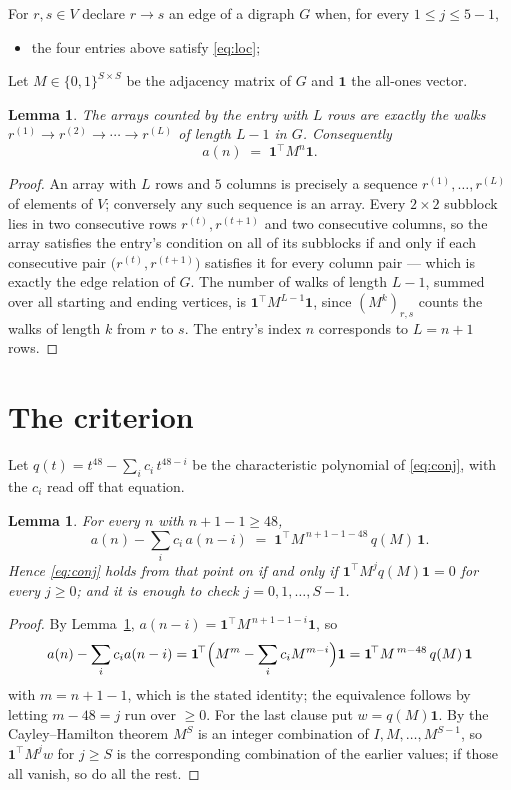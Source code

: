 \documentclass[11pt,a4paper]{article}
\theoremstyle{plain}
\newtheorem{lemma}[theorem]{Lemma}
\theoremstyle{definition}
\begin{document}
For $r,s\in V$ declare $r\to s$ an edge of a digraph $G$ when, for every
$1\le j\le 5-1$,
\begin{itemize}
\item the four entries above satisfy \eqref{eq:loc};

\end{itemize}
Let $M\in\{0,1\}^{S\times S}$ be the adjacency matrix of $G$ and $\mathbf{1}$ the
all-ones vector.

\begin{lemma}\label{lem:walk}
The arrays counted by the entry with $L$ rows are exactly the walks
$r^{(1)}\to r^{(2)}\to\cdots\to r^{(L)}$ of length $L-1$ in $G$. Consequently
\[
a(n)\;=\;\mathbf{1}^{\!\top}M^{n}\mathbf{1} .
\]
\end{lemma}

\begin{proof}
An array with $L$ rows and $5$ columns is precisely a sequence
$r^{(1)},\dots,r^{(L)}$ of elements of $V$; conversely any such sequence is an array.
Every $2\times2$ subblock lies in two consecutive rows $r^{(t)},r^{(t+1)}$ and two
consecutive columns, so the array satisfies the entry's condition on all of its subblocks
if and only if each consecutive pair $\bigl(r^{(t)},r^{(t+1)}\bigr)$ satisfies it for
every column pair --- which is exactly the edge relation of $G$. The number of walks of
length $L-1$, summed over all starting and ending vertices, is
$\mathbf{1}^{\!\top}M^{L-1}\mathbf{1}$, since $(M^{k})_{r,s}$ counts the walks of
length $k$ from $r$ to $s$. The entry's index $n$ corresponds to $L=n+1$ rows.
\end{proof}

\section{The criterion}

Let $q(t)=t^{48}-\sum_i c_i\,t^{48-i}$ be the characteristic polynomial of
\eqref{eq:conj}, with the $c_i$ read off that equation.

\begin{lemma}\label{lem:crit}
For every $n$ with $n+1-1\ge48$,
\[
a(n)-\sum_i c_i\,a(n-i)\;=\;\mathbf{1}^{\!\top}M^{\,n+1-1-48}\,q(M)\,\mathbf{1} .
\]
Hence \eqref{eq:conj} holds from that point on if and only if
$\mathbf{1}^{\!\top}M^{j}q(M)\mathbf{1}=0$ for every $j\ge0$; and it is enough to check
$j=0,1,\dots,S-1$.
\end{lemma}

\begin{proof}
By Lemma~\ref{lem:walk}, $a(n-i)=\mathbf{1}^{\!\top}M^{\,n+1-1-i}\mathbf{1}$, so
\[
a(n)-\sum_i c_i a(n-i)
=\mathbf{1}^{\!\top}\Bigl(M^{m}-\sum_i c_i M^{m-i}\Bigr)\mathbf{1}
=\mathbf{1}^{\!\top}M^{\,m-48}\,q(M)\,\mathbf{1}
\]
with $m=n+1-1$, which is the stated identity; the equivalence follows by letting
$m-48=j$ run over $\ge0$. For the last clause put $w=q(M)\mathbf{1}$. By the
Cayley--Hamilton theorem $M^{S}$ is an integer combination of $I,M,\dots,M^{S-1}$, so
$\mathbf{1}^{\!\top}M^{j}w$ for $j\ge S$ is the corresponding combination of the earlier
values; if those all vanish, so do all the rest.
\end{proof}
\end{document}
